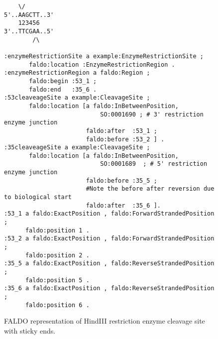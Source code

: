 \begin{figure}
\begin{shaded}
\small
\begin{verbatim}
    \/
5'..AAGCTT..3' 
    123456
3'..TTCGAA..5'
        /\
        
:enzymeRestrictionSite a example:EnzymeRestrictionSite ;
       faldo:location :EnzymeRestrictionRegion .
:enzymeRestrictionRegion a faldo:Region ;
       faldo:begin :53_1 ;
       faldo:end   :35_6 .
:53cleaveageSite a example:CleavageSite ;
       faldo:location [a faldo:InBetweenPosition, 
                           SO:0001690 ; # 3' restriction enzyme junction 
                       faldo:after  :53_1 ;        
                       faldo:before :53_2 ] .
:35cleaveageSite a example:CleavageSite ;
       faldo:location [a faldo:InBetweenPosition, 
                           SO:0001689  ; # 5' restriction enzyme junction 
                       faldo:before :35_5 ;
                       #Note the before after reversion due to biological start 
                       faldo:after  :35_6 ]. 
:53_1 a faldo:ExactPosition , faldo:ForwardStrandedPosition ;
      faldo:position 1 .
:53_2 a faldo:ExactPosition , faldo:ForwardStrandedPosition ;
      faldo:position 2 .
:35_5 a faldo:ExactPosition , faldo:ReverseStrandedPosition ;
      faldo:position 5 .
:35_6 a faldo:ExactPosition , faldo:ReverseStrandedPosition ;
      faldo:position 6 .
\end{verbatim}
\end{shaded}
\caption{FALDO representation of HindIII restriction enzyme cleavage site with sticky ends.}
\label{fig:HindIII}
\end{figure}





